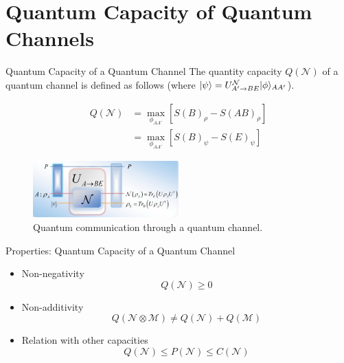 \section{Quantum Capacity of Quantum Channels}

\begin{frame}{Quantum Capacity of a Quantum Channel}
The quantity capacity $Q(\mathcal{N})$ of a quantum channel is defined as follows (where $\lvert\psi\rangle = U^{\mathcal{N}}_{A' \rightarrow BE} \lvert\phi\rangle_{AA'}$).
\begin{tcolorbox}
\begin{align*}
Q(\mathcal{N}) &= \max_{\phi_{AA'}} \left[ S(B)_\rho - S(AB)_\rho \right] \\
&= \max_{\phi_{AA'}} \left[ S(B)_\psi - S(E)_\psi \right]
\end{align*}
\end{tcolorbox}

\begin{figure}
    \includegraphics[width=0.5\textwidth]{figures/quantum_communication_quantum_channel.png}
    \caption{Quantum communication through a quantum channel.}
\end{figure}
\end{frame}

\begin{frame}{Properties: Quantum Capacity of a Quantum Channel}
\begin{itemize}
    \setlength{\itemsep}{1.5em}
    \item Non-negativity
    $$Q(\mathcal{N}) \geq 0$$
    \item Non-additivity
    $$Q(\mathcal{N} \otimes \mathcal{M}) \neq Q(\mathcal{N}) + Q(\mathcal{M})$$
    \item Relation with other capacities
    $$Q(\mathcal{N}) \leq P(\mathcal{N}) \leq C(\mathcal{N})$$
\end{itemize}
\end{frame}
